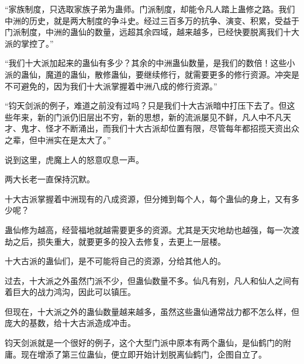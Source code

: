 \begin{this_body}
“家族制度，只选取家族子弟为蛊师。门派制度，却能令凡人踏上蛊修之路。我们中洲的历史，就是两大制度的争斗史。经过三百多万的抗争、演变、积累，受益于门派制度，中洲的蛊仙的数量，远超其余四域，越来越多，已经快要脱离我们十大派的掌控了。”

“我们十大派加起来的蛊仙有多少？其余的中洲蛊仙数量，是我们的数倍！这些小派的蛊仙，魔道的蛊仙，散修蛊仙，要继续修行，就需要更多的修行资源。冲突是不可避免的，因为我们十大派掌握着中洲八成的修行资源。”

“钧天剑派的例子，难道之前没有过吗？只是我们十大古派暗中打压下去了。但这些年来，新的门派仍旧层出不穷，新的思想，新的流派屡见不鲜，凡人中不凡天才、鬼才、怪才不断涌出，而我们十大古派却位置有限，尽管每年都招揽天资出众之辈，但中洲实在是太大了。”

说到这里，虎魔上人的怒意叹息一声。

两大长老一直保持沉默。

十大古派掌握着中洲现有的八成资源，但分摊到每个人，每个蛊仙的身上，又有多少呢？

蛊仙修为越高，经营福地就越需要更多的资源。尤其是天灾地劫也越强，每一次渡劫之后，损失重大，就要更多的投入去修复，去更上一层楼。

十大古派的蛊仙们，是不可能将自己的资源，分给其他人的。

过去，十大派之外虽然门派不少，但蛊仙数量不多。仙凡有别，凡人和仙人之间有着巨大的战力鸿沟，因此可以镇压。

但现在，十大派之外的蛊仙数量越来越多，虽然这些蛊仙通常战力都不怎么样，但庞大的基数，给十大古派造成冲击。

钧天剑派就是一个很好的例子，这个大型门派中原本有两个蛊仙，是仙鹤门的附庸。现在增添了第三位蛊仙，便立即开始计划脱离仙鹤门，企图自立了。

\end{this_body}

